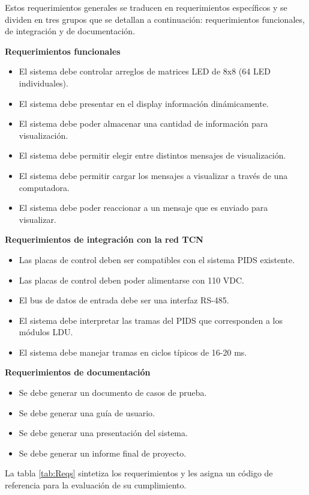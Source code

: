 Estos requerimientos generales se traducen en requerimientos específicos y se dividen en tres grupos que se detallan a continuación: requerimientos funcionales, de integración y de documentación. 

\textbf{Requerimientos funcionales
}\begin{itemize}
\item El sistema debe controlar arreglos de matrices LED de 8x8 (64 LED individuales).
\item El sistema debe presentar en el display información dinámicamente.
\item El sistema debe poder almacenar una cantidad de información para visualización.
\item El sistema debe permitir elegir entre distintos mensajes de visualización.
\item El sistema debe permitir cargar los mensajes a visualizar a través de una computadora.
\item El sistema debe poder reaccionar a un mensaje que es enviado para visualizar.
\end{itemize}

\textbf{Requerimientos de integración con la red TCN
}\begin{itemize}
\item Las placas de control deben ser compatibles con el sistema PIDS existente.
\item Las placas de control deben poder alimentarse con 110 VDC.
\item El bus de datos de entrada debe ser una interfaz RS-485.
\item El sistema debe interpretar las tramas del PIDS que corresponden a los módulos LDU.
\item El sistema debe manejar tramas en ciclos típicos de 16-20 ms.
\end{itemize}

\textbf{Requerimientos de documentación
}\begin{itemize}
\item Se debe generar un documento de casos de prueba.
\item Se debe generar una guía de usuario.
\item Se debe generar una presentación del sistema.
\item Se debe generar un informe final de proyecto.
\end{itemize}

La tabla \ref{tab:Reqs} sintetiza los requerimientos y les asigna un código de referencia para la evaluación de su cumplimiento.
	
